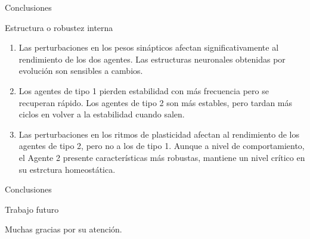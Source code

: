 \documentclass[aspectratio=169]{beamer}
\begin{document}
\begin{frame}{Conclusiones}
\begin{block}{Estructura o robustez interna}
  \begin{enumerate}
    \item Las perturbaciones en los pesos sinápticos afectan significativamente al rendimiento de los dos agentes. Las estructuras neuronales obtenidas por evolución son sensibles a cambios.
    \item Los agentes de tipo 1 pierden estabilidad con más frecuencia pero se recuperan rápido. Los agentes de tipo 2 son más estables, pero tardan más ciclos en volver a la estabilidad cuando salen.
    \item Las perturbaciones en los ritmos de plasticidad afectan al rendimiento de los agentes de tipo 2, pero no a los de tipo 1. Aunque a nivel de comportamiento, el Agente 2 presente características más robustas,
    mantiene un nivel crítico en su estrctura homeostática.
  \end{enumerate}
\end{block}
\end{frame}

\begin{frame}{Conclusiones}
\begin{block}{Trabajo futuro}

\end{block}
\end{frame}



{
\begin{frame}[standout]
  Muchas gracias por su atención.
\end{frame}
}
\end{document}
